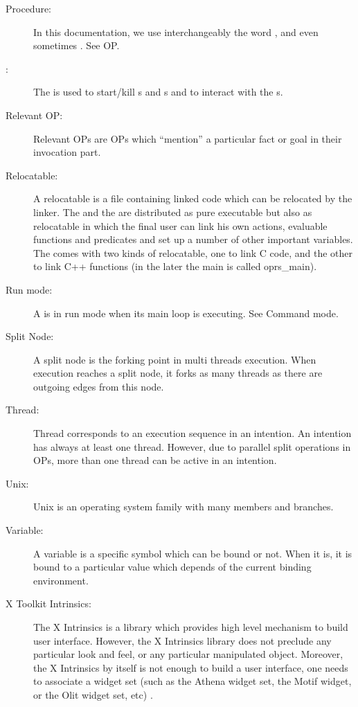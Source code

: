 \begin{description}
\item[Procedure:] In this documentation, we use interchangeably the
word ,  and even sometimes . See OP.

\item[\OPRSS{}:] The \OPRSS{} is used to start/kill \CPK{}s and
\XPK{}s and to interact with the \CPK{}s.

\item[Relevant OP:] Relevant OPs are OPs which ``mention'' a particular fact or
goal in their invocation part. 

\item[Relocatable:] A relocatable is a file containing linked code which can be
relocated by the linker. The \CPK{} and the \XPK{} are distributed as pure
executable but also as relocatable in which the final user can link his own
actions, evaluable functions and predicates and set up a number of other
important variables. The \COPRSDE{} comes with two kinds of relocatable, one to
link C code, and the other to link C++ functions (in the later the main is
called oprs\_main).

\item[Run mode:] A \CPK{} is in run mode when its main loop is executing. See
Command mode. 

\item[Split Node:] A split node is the forking point in multi threads
execution.  When execution reaches a split node, it forks as many threads as
there are outgoing edges from this node.

\item[Thread:] Thread corresponds to an execution sequence in an intention. An
intention has always at least one thread. However, due to parallel split
operations in OPs, more than one thread can be active in an intention.

\item[Unix:] Unix is an operating system family with many members and branches.

\item[Variable:] A variable is a specific symbol which can be bound or not.
When it is, it is bound to a particular value which depends of the current
binding environment.

\item[X Toolkit Intrinsics:] The X Intrinsics is a library which provides high
level mechanism to build user interface. However, the X Intrinsics library does
not preclude any particular look and feel, or any particular manipulated
object. Moreover, the X Intrinsics by itself is not enough to build a user
interface, one needs to associate a widget set (such as the Athena widget set,
the Motif widget, or the Olit widget set, etc) \cite{Xt-manual}.


\end{description}
